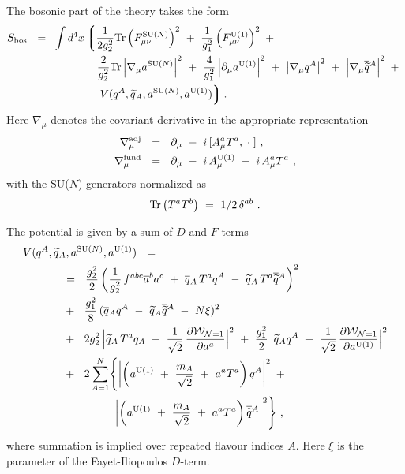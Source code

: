 \documentclass[12pt]{article}
\def\Tr{{\rm Tr}}
\newcommand{\p}{\partial}
\newcommand{\wt}{\widetilde}
\newcommand{\ov}{\overline}
\newcommand{\mc}[1]{\mathcal{#1}}
\newcommand{\lgr}{\left\lgroup}
\newcommand{\rgr}{\right\rgroup}
\newcommand{\aU}{a^{\rm U(1)}}
\newcommand{\aN}{a^\text{SU($N$)}}
\begin{document}
The bosonic part of the theory takes the form
\begin{align}
%
\label{theory}
	S_{\rm bos} ~~=~~ & \int d^4 x 
		\lgr
			\frac{1}{2g_2^2}\Tr \left(F_{\mu\nu}^\text{SU($N$)}\right)^2  ~+~
			\frac{1}{g_1^2} \left(F_{\mu\nu}^{\rm U(1)}\right)^2 ~+~ 
			\right. 
			\\
%
\notag
		&
			\phantom{int d^4 x \lgr\right.}
			\frac{2}{g_2^2}\Tr \left|\nabla_\mu \aN \right|^2   ~+~
			\frac{4}{g_1^2} \left|\p_\mu \aU \right|^2
			~+~
			\left| \nabla_\mu q^A \right|^2 ~+~ \left|\nabla_\mu \ov{\wt{q}}{}^A \right|^2 
			~+~
			\\
%
\notag
		&
			\phantom{int d^4 x \lgr\right.}
		\left.
			V(q^A, \wt{q}{}_A, \aN, \aU)
		\rgr .
\end{align}
Here $ \nabla_\mu $ denotes the covariant derivative in the appropriate representation
\begin{align*}
%
	\nabla_\mu^{\rm adj} & ~~=~~ \p_\mu  ~-~ i\, [ A_\mu^a T^a, \;\cdot\;]~, \\
%
	\nabla_\mu^{\rm fund} & ~~=~~ \p_\mu ~-~ i\,A^{\rm U(1)}_\mu ~-~ i\, A_\mu^a T^a~,
\end{align*}
with the SU($N$) generators normalized as
\[
	\Tr \left( T^a T^b \right) ~=~ 1/2 \, \delta^{ab}~.
\]

The potential is given by a sum of $ D $ and $ F $ terms
\begin{align}
%
\notag
	& V(q^A, \wt{q}{}_A, \aN, \aU) ~~=~~ 
	\\
%
\notag
	&\qquad\quad ~~=~~
			\frac{g_2^2}{2} \left( \frac{1}{g_2^2}\,f^{abc}\ov{a}{}^b a^c 
				~+~ \ov{q}{}_A\, T^a q^A ~-~ \wt{q}{}_A\, T^a \ov{\wt{q}}{}^A \right)^2 
	\\
%
\label{V}
	&\qquad\quad ~~+~~
		\frac{g_1^2}{8}\, (\ov{q}{}_A q^A ~-~ \wt{q}{}_A \ov{\wt{q}}{}^A ~-~ N\xi )^2
	\\
%
\notag
	&\qquad\quad ~~+~~
		2g_2^2\, \Bigl| \wt{q}{}_A\,T^a q_A ~+~ 
			\frac{1}{\sqrt{2}}\, \frac{\p\mc{W}_{\mc{N}=1}}{\p a^a} \Bigr|^2
	~+~
	\frac{g_1^2}{2}\, \Bigl| \wt{q}{}_A q^A ~+~ 
			\frac{1}{\sqrt{2}}\, \frac{\p\mc{W}_{\mc{N}=1}}{\p\aU} \Bigr|^2
	\\
%
\notag
	&\qquad\quad ~~+~~
	2 \sum_{A=1}^{N} \Biggl\{  
		\left| \left( \aU ~+~ \frac{m_A}{\sqrt{2}} ~+~ a^a T^a \right) q^A \right|^2  ~+~
	\\
%
\notag
	&\phantom{\qquad\quad ~~+~~ 2 \sum_{A=1}^{N} \Biggl\{  }
		\left| \left( \aU ~+~ \frac{m_A}{\sqrt{2}} ~+~ a^a T^a \right) \ov{\wt{q}}{}^A \right|^2  
			\Biggr\}~,
\end{align}
	where summation is implied over repeated flavour indices $A$.
	Here $\xi$ is the parameter of the Fayet-Iliopoulos $ D $-term. 
\end{document}
